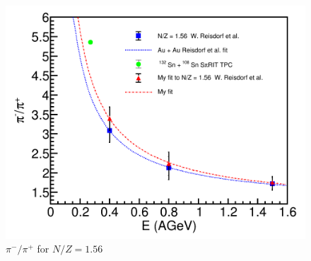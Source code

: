 \documentclass[12pt, letterpaper, twoside]{article}
\begin{document}
\begin{figure}[!hbt]
\centering
\includegraphics[width=\textwidth]{pionratio.png}
\caption{$\pi^-/\pi^+$ for $N/Z=1.56$}
\label{fig:pionratio}
\end{figure}
 
 
 
 
 
 
\newpage


 
 
\end{document}
